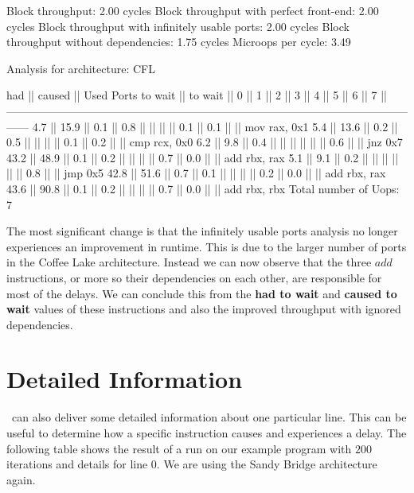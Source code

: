 \begin{example}
Block throughput: 2.00 cycles
Block throughput with perfect front-end: 2.00 cycles
Block throughput with infinitely usable ports: 2.00 cycles
Block throughput without dependencies: 1.75 cycles
Microops per cycle: 3.49

Analysis for architecture: CFL

   had   || caused  ||            Used Ports
 to wait || to wait ||   0   ||   1   ||   2   ||   3   ||   4   ||   5   ||   6   ||   7   ||
------------------------------------------------------------------------------------------------------------------
   4.7   ||  15.9   ||  0.1  ||  0.8  ||       ||       ||       ||  0.1  ||  0.1  ||       || mov rax, 0x1
   5.4   ||  13.6   ||  0.2  ||  0.5  ||       ||       ||       ||  0.1  ||  0.2  ||       || cmp rcx, 0x0
   6.2   ||   9.8   ||  0.4  ||       ||       ||       ||       ||       ||  0.6  ||       || jnz 0x7
  43.2   ||  48.9   ||  0.1  ||  0.2  ||       ||       ||       ||  0.7  ||  0.0  ||       || add rbx, rax
   5.1   ||   9.1   ||  0.2  ||       ||       ||       ||       ||       ||  0.8  ||       || jmp 0x5
  42.8   ||  51.6   ||  0.7  ||  0.1  ||       ||       ||       ||  0.2  ||  0.0  ||       || add rbx, rax
  43.6   ||  90.8   ||  0.1  ||  0.2  ||       ||       ||       ||  0.7  ||  0.0  ||       || add rbx, rbx
Total number of Uops: 7
\end{example}

The most significant change is that the infinitely usable ports analysis no longer experiences an improvement in runtime. This is due to the larger number of ports in the Coffee Lake architecture. Instead we can now observe that the three $add$ instructions, or more so their dependencies on each other, are responsible for most of the delays. We can conclude this from the \textbf{had to wait} and \textbf{caused to wait} values of these instructions and also the improved throughput with ignored dependencies.



\section{Detailed Information}
\label{sec:detail}

\suaca\ can also deliver some detailed information about one particular line. This can be useful to determine how a specific instruction causes and experiences a delay. The following table shows the result of a run on our example program with $200$ iterations and details for line $0$. We are using the Sandy Bridge architecture again.

